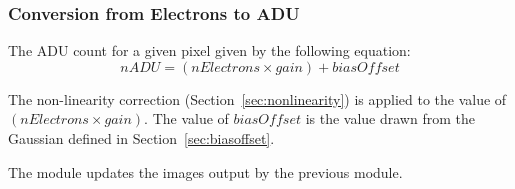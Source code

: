 \documentclass[11pt]{article}      %
\def\HCode#1{}
\def\htmlanchor#1{\HCode{<a id="#1"></a>}}
\begin{document}


\subsubsection{Conversion from Electrons to ADU}

The ADU count for a given pixel given by the following equation:
\begin{equation}
nADU=(nElectrons\times gain)+biasOffset
\label{eq:bias}
\end{equation}

The non-linearity correction (Section~\ref{sec:nonlinearity}) is applied to the value of $(nElectrons\times gain)$. The value of $biasOffset$ is the value drawn from the Gaussian defined in Section~\ref{sec:biasoffset}.

The module updates the images output by the previous module.
\end{document}
